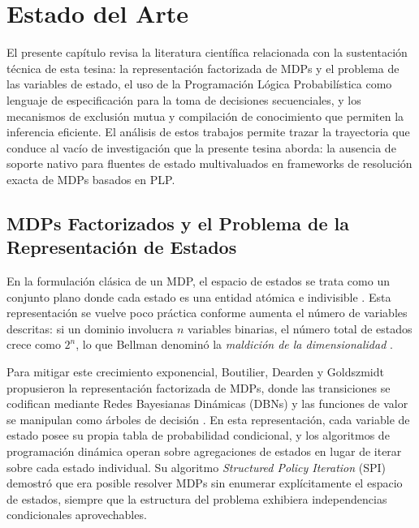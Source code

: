 
\section{Estado del Arte}
\label{ch:estado-del-arte}

El presente capítulo revisa la literatura científica relacionada con la sustentación técnica de esta tesina: la representación factorizada de MDPs y el problema de las variables de estado, el uso de la Programación Lógica Probabilística como lenguaje de especificación para la toma de decisiones secuenciales, y los mecanismos de exclusión mutua y compilación de conocimiento que permiten la inferencia eficiente. El análisis de estos trabajos permite trazar la trayectoria que conduce al vacío de investigación que la presente tesina aborda: la ausencia de soporte nativo para fluentes de estado multivaluados en frameworks de resolución exacta de MDPs basados en PLP.

\subsection{MDPs Factorizados y el Problema de la Representación de Estados}
\label{sec:ea-factorizados}

En la formulación clásica de un MDP, el espacio de estados se trata como un conjunto plano donde cada estado es una entidad atómica e indivisible \cite{puterman2014markov}. Esta representación se vuelve poco práctica conforme aumenta el número de variables descritas: si un dominio involucra $n$ variables binarias, el número total de estados crece como $2^n$, lo que Bellman denominó la \textit{maldición de la dimensionalidad} \cite{bellman1957dynamic}.

Para mitigar este crecimiento exponencial, Boutilier, Dearden y Goldszmidt propusieron la representación factorizada de MDPs, donde las transiciones se codifican mediante Redes Bayesianas Dinámicas (DBNs) y las funciones de valor se manipulan como árboles de decisión \cite{boutilier2000stochastic}. En esta representación, cada variable de estado posee su propia tabla de probabilidad condicional, y los algoritmos de programación dinámica operan sobre agregaciones de estados en lugar de iterar sobre cada estado individual. Su algoritmo \textit{Structured Policy Iteration} (SPI) demostró que era posible resolver MDPs sin enumerar explícitamente el espacio de estados, siempre que la estructura del problema exhibiera independencias condicionales aprovechables.

